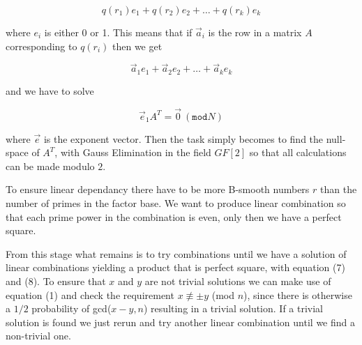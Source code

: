 \begin{equation}
q(r_1)e_1 + q(r_2)e_2 + \ldots + q(r_k)e_k
\end{equation}

where $e_i$ is either 0 or 1. This means that if $\vec{a}_i$ is the
row in a matrix $A$ corresponding to $q(r_i)$ then we get

\begin{equation}
\vec{a}_1 e_1 + \vec{a}_2 e_2 + \ldots + \vec{a}_k e_k
\end{equation}

and we have to solve 

\begin{equation}
\vec{e}_1 A^T = \vec{0} \ (\texttt{mod} N)
\end{equation}

where $\vec{e}$ is the exponent vector. Then the task simply becomes to find the 
null-space of $A^T$, with Gauss Elimination in the field $GF[2]$ so that all calculations 
can be made modulo $2$.

To ensure linear dependancy there have to be more B-smooth numbers $r$ than the number of primes 
in the factor base. We want to produce linear combination so that each prime power in the combination is even, 
only then we have a perfect square. 

From this stage what remains is to try combinations until we have
a solution of linear combinations yielding a product that is perfect square,
with equation (7) and (8). To ensure that $x$ and $y$ are not trivial solutions
we can make use of equation (1) and check the requirement $x \not\equiv \pm y$ (mod $n$),
since there is otherwise a $1/2$ probability of gcd($x-y,n$) resulting in a 
trivial solution. If a trivial solution is found we just rerun and try another linear
combination until we find a non-trivial one.



